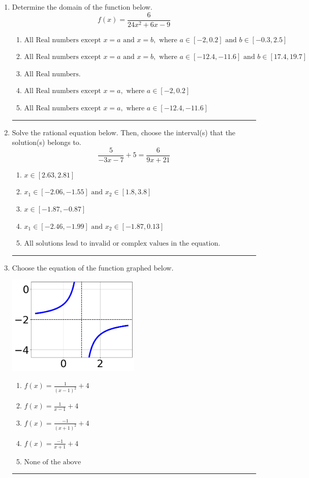 \documentclass[14pt]{extbook}
\newcommand{\litem}[1]{\item#1\hspace*{-1cm}\rule{\textwidth}{0.4pt}}
\begin{document}
\begin{enumerate}
\litem{
Determine the domain of the function below.\[ f(x) = \frac{6}{24x^{2} +6 x -9} \]\begin{enumerate}[label=\Alph*.]
\item \( \text{All Real numbers except } x = a \text{ and } x = b, \text{ where } a \in [-2, 0.2] \text{ and } b \in [-0.3, 2.5] \)
\item \( \text{All Real numbers except } x = a \text{ and } x = b, \text{ where } a \in [-12.4, -11.6] \text{ and } b \in [17.4, 19.7] \)
\item \( \text{All Real numbers.} \)
\item \( \text{All Real numbers except } x = a, \text{ where } a \in [-2, 0.2] \)
\item \( \text{All Real numbers except } x = a, \text{ where } a \in [-12.4, -11.6] \)

\end{enumerate} }
\litem{
Solve the rational equation below. Then, choose the interval(s) that the solution(s) belongs to.\[ \frac{5}{-3x -7} + 5 = \frac{6}{9x + 21} \]\begin{enumerate}[label=\Alph*.]
\item \( x \in [2.63,2.81] \)
\item \( x_1 \in [-2.06, -1.55] \text{ and } x_2 \in [1.8,3.8] \)
\item \( x \in [-1.87,-0.87] \)
\item \( x_1 \in [-2.46, -1.99] \text{ and } x_2 \in [-1.87,0.13] \)
\item \( \text{All solutions lead to invalid or complex values in the equation.} \)

\end{enumerate} }
\litem{
Choose the equation of the function graphed below.
\begin{center}
    \includegraphics[width=0.5\textwidth]{../Figures/rationalGraphToEquationCopyB.png}
\end{center}
\begin{enumerate}[label=\Alph*.]
\item \( f(x) = \frac{1}{(x - 1)^2} + 4 \)
\item \( f(x) = \frac{1}{x - 1} + 4 \)
\item \( f(x) = \frac{-1}{(x + 1)^2} + 4 \)
\item \( f(x) = \frac{-1}{x + 1} + 4 \)
\item \( \text{None of the above} \)


\end{enumerate}}
\end{enumerate}
\end{document}
